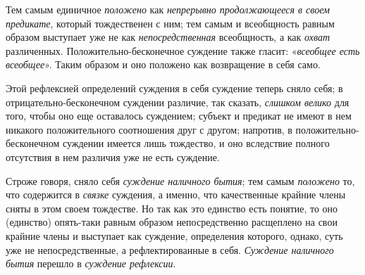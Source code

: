 \documentclass[twoside]{article}
\begin{document}
{{{Тем самым единичное
{\em положено} как
{\em непрерывно продолжающееся в своем
предикате}, который тождественен с ним; тем самым и
всеобщность равным образом выступает уже не как
{\em непосредственная}
всеобщность, а как
{\em охват} различенных.
Положительно-бесконечное суждение также гласит:
«{\em всеобщее есть всеобщее}».
Таким образом и оно положено как возвращение в себя само.

Этой рефлексией определений суждения в себя суждение теперь
сняло себя; в отрицательно-бесконечном суждении различие, так сказать,
{\em слишком велико} для
того, чтобы оно еще оставалось суждением; субъект и предикат не имеют в нем
никакого положительного соотношения друг с другом; напротив, в
положительно-бесконечном суждении имеется лишь тождество, и оно вследствие
полного отсутствия в нем различия уже не есть суждение.

Строже говоря, сняло себя
{\em суждение наличного бытия};
тем самым {\em положено}
то, что содержится в
{\em связке} суждения, а
именно, что качественные крайние члены сняты в этом своем тождестве. Но так
как это единство есть понятие, то оно (единство) опять-таки равным образом
непосредственно расщеплено на свои крайние члены и выступает как суждение,
определения которого, однако, суть уже не непосредственные, а
рефлектированные в себя. {\em Суждение
наличного бытия} перешло в
{\em суждение рефлексии}.

}}}
\end{document}
